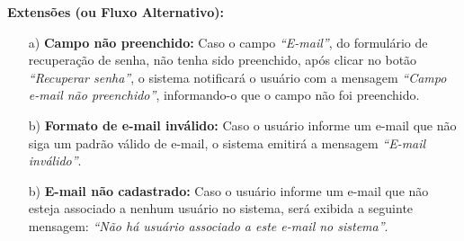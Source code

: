 \begin{quadro}[H]
\begin{framed}
\begin{flushleft}
		\textbf{Extensões (ou Fluxo Alternativo):}
		\begin{itemize}
			\item[a)] \textbf{Campo não preenchido:} Caso o campo \textit{``E-mail''}, do formulário de recuperação de senha, não tenha sido preenchido, após clicar no botão \textit{``Recuperar senha''}, o sistema notificará o usuário com a mensagem \textit{``Campo e-mail não preenchido''}, informando-o que o campo não foi preenchido.
			\item[b)] \textbf{Formato de e-mail inválido:} Caso o usuário informe um e-mail que não siga um padrão válido de e-mail, o sistema emitirá a mensagem \textit{``E-mail inválido''}.
			\item[b)] \textbf{E-mail não cadastrado:} Caso o usuário informe um e-mail que não esteja associado a nenhum usuário no sistema, será exibida a seguinte mensagem: \emph{``Não há usuário associado a este e-mail no sistema''}.
		\end{itemize}


		\end{flushleft}

	\end{framed}

\end {quadro} %




